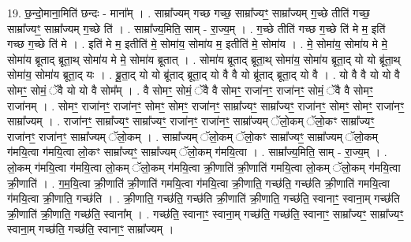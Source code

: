 \documentclass[17pt]{extarticle}
\begin{document}
19. छ॒न्दो॒माना॒मिति॑ छन्दः - माना᳚म् । . साम्रा᳚ज्यम् गच्छ गच्छ॒ साम्रा᳚ज्यꣳ॒॒ साम्रा᳚ज्यम् ग॒च्छे तीति॑ गच्छ॒ साम्रा᳚ज्यꣳ॒॒ साम्रा᳚ज्यम् ग॒च्छे ति॑ । . साम्रा᳚ज्य॒मिति॒ साम् - रा॒ज्य॒म् । . ग॒च्छे तीति॑ गच्छ ग॒च्छे ति॑ मे म॒ इति॑ गच्छ ग॒च्छे ति॑ मे । . इति॑ मे म॒ इतीति॑ मे॒ सोमा॑य॒ सोमा॑य म॒ इतीति॑ मे॒ सोमा॑य । . मे॒ सोमा॑य॒ सोमा॑य मे मे॒ सोमा॑य ब्रूताद् ब्रूता॒थ् सोमा॑य मे मे॒ सोमा॑य ब्रूतात् । . सोमा॑य ब्रूताद् ब्रूता॒थ् सोमा॑य॒ सोमा॑य ब्रूता॒द् यो यो ब्रू॑ता॒थ् सोमा॑य॒ सोमा॑य ब्रूता॒द् यः । . ब्रू॒ता॒द् यो यो ब्रू॑ताद् ब्रूता॒द् यो वै वै यो ब्रू॑ताद् ब्रूता॒द् यो वै । . यो वै वै यो यो वै सोमꣳ॒॒ सोमं॒ ॅवै यो यो वै सोम᳚म् । . वै सोमꣳ॒॒ सोमं॒ ॅवै वै सोमꣳ॒॒ राजा॑नꣳ॒॒ राजा॑नꣳ॒॒ सोमं॒ ॅवै वै सोमꣳ॒॒ राजा॑नम् । . सोमꣳ॒॒ राजा॑नꣳ॒॒ राजा॑नꣳ॒॒ सोमꣳ॒॒ सोमꣳ॒॒ राजा॑नꣳ॒॒ साम्रा᳚ज्यꣳ॒॒ साम्रा᳚ज्यꣳ॒॒ राजा॑नꣳ॒॒ सोमꣳ॒॒ सोमꣳ॒॒ राजा॑नꣳ॒॒ साम्रा᳚ज्यम् । . राजा॑नꣳ॒॒ साम्रा᳚ज्यꣳ॒॒ साम्रा᳚ज्यꣳ॒॒ राजा॑नꣳ॒॒ राजा॑नꣳ॒॒ साम्रा᳚ज्यम् ॅलो॒कम् ॅलो॒कꣳ साम्रा᳚ज्यꣳ॒॒ राजा॑नꣳ॒॒ राजा॑नꣳ॒॒ साम्रा᳚ज्यम् ॅलो॒कम् । . साम्रा᳚ज्यम् ॅलो॒कम् ॅलो॒कꣳ साम्रा᳚ज्यꣳ॒॒ साम्रा᳚ज्यम् ॅलो॒कम् ग॑मयि॒त्वा ग॑मयि॒त्वा लो॒कꣳ साम्रा᳚ज्यꣳ॒॒ साम्रा᳚ज्यम् ॅलो॒कम् ग॑मयि॒त्वा । . साम्रा᳚ज्य॒मिति॒ साम् - रा॒ज्य॒म् । . लो॒कम् ग॑मयि॒त्वा ग॑मयि॒त्वा लो॒कम् ॅलो॒कम् ग॑मयि॒त्वा क्री॒णाति॑ क्री॒णाति॑ गमयि॒त्वा लो॒कम् ॅलो॒कम् ग॑मयि॒त्वा क्री॒णाति॑ । . ग॒म॒यि॒त्वा क्री॒णाति॑ क्री॒णाति॑ गमयि॒त्वा ग॑मयि॒त्वा क्री॒णाति॒ गच्छ॑ति॒ गच्छ॑ति क्री॒णाति॑ गमयि॒त्वा ग॑मयि॒त्वा क्री॒णाति॒ गच्छ॑ति । . क्री॒णाति॒ गच्छ॑ति॒ गच्छ॑ति क्री॒णाति॑ क्री॒णाति॒ गच्छ॑ति॒ स्वानाꣳ॒॒ स्वाना॒म् गच्छ॑ति क्री॒णाति॑ क्री॒णाति॒ गच्छ॑ति॒ स्वाना᳚म् । . गच्छ॑ति॒ स्वानाꣳ॒॒ स्वाना॒म् गच्छ॑ति॒ गच्छ॑ति॒ स्वानाꣳ॒॒ साम्रा᳚ज्यꣳ॒॒ साम्रा᳚ज्यꣳ॒॒ स्वाना॒म् गच्छ॑ति॒ गच्छ॑ति॒ स्वानाꣳ॒॒ साम्रा᳚ज्यम् । \newline
\end{document}
